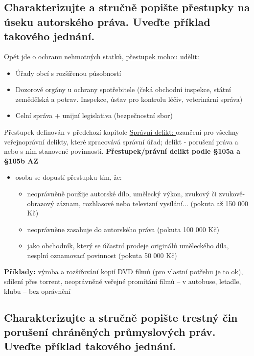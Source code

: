 \subsection{Charakterizujte a stručně popište přestupky na úseku autorského práva. Uveďte příklad takového jednání.}
Opět jde o ochranu nehmotných statků, \underline{přestupek mohou udělit:}
\begin{itemize}
    \item Úřady obcí s rozšířenou působností
    \item Dozorové orgány u ochrany spotřebitele (čeká obchodní inspekce, státní zemědělská a potrav.
    Inspekce, ústav pro kontrolu léčiv, veterinární správa)
    \item Celní správa + unijní legislativa (bezpečnostní sbor)
\end{itemize}

Přestupek definován v předchozí kapitole\newline
\newline\underline{Správní delikt: }ozančení pro všechny veřejnoprávní delikty, které zpracovává správní úřad; delikt - porušení práva a nebo s ním stanovené povinnosti.
\newline
\newline\textbf{Přestupek/právní delikt podle §105a a §105b AZ}
\begin{itemize}
    \item osoba se dopustí přestupku tím, že:
    \begin{itemize}
        \item neoprávněně použije autorské dílo, umělecký výkon, zvukový či
         zvukově-obrazový záznam, rozhlasové nebo televizní vysílání...
         (pokuta až 150 000 Kč)
        \item neoprávněne zasahuje do autorského práva (pokuta 100 000 Kč)
        \item jako obchodník, který se účastní prodeje originálů uměleckého
         díla, nesplní oznamovací povinnost (pokuta 50 000 Kč)
    \end{itemize}
\end{itemize}
\textbf{Příklady:} výroba a rozšiřování kopií DVD filmů (pro vlastní potřebu je to ok),
sdílení přes torrent, neoprávněné veřejné promítání filmů – v autobuse,
letadle, klubu – bez oprávnění

\subsection{Charakterizujte a stručně popište trestný čin porušení chráněných průmyslových práv. Uveďte příklad takového jednání.}

